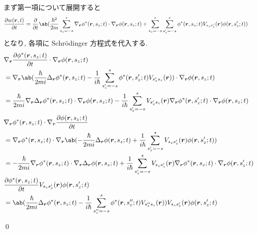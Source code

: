 \documentclass[uplatex,dvipdfmx,a4paper,11pt]{jlreq}
\makeatletter
\newcommand{\rr}{\bm{r}}
\numberwithin{equation}{section}
\theoremstyle{definition}
\renewenvironment{proof}[1][\proofname]{\par
  \normalfont
  \topsep6\p@\@plus6\p@ \trivlist
  \item[\hskip\labelsep{\bfseries #1}\@addpunct{\bfseries}]\ignorespaces\quad\par
}{
  \qed\endtrivlist\@endpefalse
}
\renewcommand\proofname{証明}
\makeatother
\begin{document}
\begin{proof}
  まず第一項について展開すると
  \begin{align}
    \diffp{w(\rr, t)}{t} & = \diffp{}{t}\ab(\frac{\hbar^2}{2m}\sum_{s_z = -s}^{s}\nabla_{\rr}\phi^*(\rr, s_z; t)\cdot\nabla_{\rr}\phi(\rr, s_z; t) + \sum_{s_z = -s}^{s}\sum_{s_z' = -s}^{s}\phi^*(\rr, s_z; t)V_{s_zs_z'}(\rr)\phi(\rr, s_z'; t))
  \end{align}
  となり, 各項に Schrödinger 方程式を代入する.
  \begin{align}
     & \nabla_{\rr}\diffp{\phi^*(\rr, s_z; t)}{t}\cdot\nabla_{\rr}\phi(\rr, s_z; t)                                                                                                                                               \\
     & = \nabla_{\rr}\ab(\frac{\hbar}{2mi}\Delta_{\rr}\phi^*(\rr, s_z; t) - \frac{1}{i\hbar}\sum_{s_z' = -s}^{s}\phi^*(\rr, s_z'; t)V_{s_z's_z}(\rr))\cdot\nabla_{\rr}\phi(\rr, s_z; t)                                           \\
     & = \frac{\hbar}{2mi}\nabla_{\rr}\Delta_{\rr}\phi^*(\rr, s_z; t)\cdot\nabla_{\rr}\phi(\rr, s_z; t) - \frac{1}{i\hbar}\sum_{s_z' = -s}^{s}V_{s_z's_z}(\rr)\nabla_{\rr}\phi^*(\rr, s_z'; t)\cdot\nabla_{\rr}\phi(\rr, s_z; t)  \\
     & \nabla_{\rr}\phi^*(\rr, s_z; t)\cdot\nabla_{\rr}\diffp{\phi(\rr, s_z; t)}{t}                                                                                                                                               \\
     & = \nabla_{\rr}\phi^*(\rr, s_z; t)\cdot\nabla_{\rr}\ab(-\frac{\hbar}{2mi}\Delta_{\rr}\phi(\rr, s_z; t) + \frac{1}{i\hbar}\sum_{s_z' = -s}^{s}V_{s_zs_z'}(\rr)\phi(\rr, s_z'; t))                                            \\
     & = -\frac{\hbar}{2mi}\nabla_{\rr}\phi^*(\rr, s_z; t)\cdot\nabla_{\rr}\Delta_{\rr}\phi(\rr, s_z; t) + \frac{1}{i\hbar}\sum_{s_z' = -s}^{s}V_{s_zs_z'}(\rr)\nabla_{\rr}\phi^*(\rr, s_z; t)\cdot\nabla_{\rr}\phi(\rr, s_z'; t) \\
     & \diffp{\phi^*(\rr, s_z; t)}{t}V_{s_zs_z'}(\rr)\phi(\rr, s_z'; t)                                                                                                                                                           \\
     & = \ab(\frac{\hbar}{2mi}\Delta_{\rr}\phi^*(\rr, s_z; t) - \frac{1}{i\hbar}\sum_{s_z'' = -s}^{s}\phi^*(\rr, s_z''; t)V_{s_z''s_z}(\rr))V_{s_zs_z'}(\rr)\phi(\rr, s_z'; t)                                                    \\

\end{align}
\end{proof}
\end{document}
